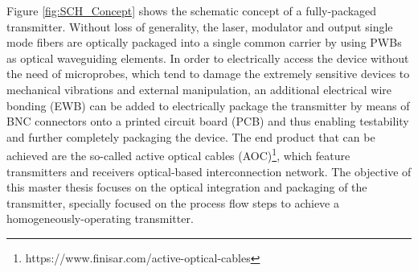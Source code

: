 Figure \ref{fig:SCH_Concept} shows the schematic concept of a fully-packaged transmitter. Without loss of generality, the laser, modulator and output single mode fibers are optically packaged into a single common carrier by using PWBs as optical waveguiding elements. In order to electrically access the device without the need of microprobes, which tend to damage the extremely sensitive devices to mechanical vibrations and external manipulation, an additional electrical wire bonding (EWB) can be added to electrically package the transmitter by means of BNC connectors onto a printed circuit board (PCB) and thus enabling testability and further completely packaging the device. The end product that can be achieved are the so-called active optical cables (AOC)\footnote{https://www.finisar.com/active-optical-cables}, which feature transmitters and receivers optical-based interconnection network. The objective of this master thesis focuses on the optical integration and packaging of the transmitter, specially focused on the process flow steps to achieve a homogeneously-operating transmitter.


\par\medskip

